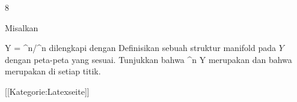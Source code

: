 {8}
{

Misalkan

\mavergleichskette
{\vergleichskette
{ Y
}
{ = }{ \R^n/\Z^n
}
{  }{
}
{    }{
}
{   }{
}
}
{}{}{}
dilengkapi dengan
Definisikan sebuah struktur manifold pada $Y$ dengan peta-peta yang sesuai. Tunjukkan bahwa
\maabbdisp {\varphi} {\R^n } { Y
} {}
merupakan
dan bahwa
merupakan
di setiap titik.

}
{} {}

 [[Kategorie:Latexseite]]
